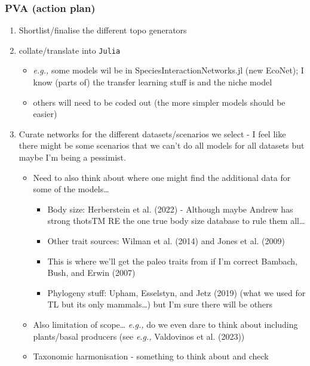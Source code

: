 \documentclass[
  letterpaper,
  DIV=11,
  numbers=noendperiod]{scrartcl}
\providecommand{\tightlist}{%
  \setlength{\itemsep}{0pt}\setlength{\parskip}{0pt}}\usepackage{longtable,booktabs,array}
\begin{document}
\subsubsection{PVA (action plan)}\label{pva-action-plan}

\begin{enumerate}
\def\labelenumi{\arabic{enumi}.}
\tightlist
\item
  Shortlist/finalise the different topo generators
\item
  collate/translate into \texttt{Julia}

  \begin{itemize}
  \tightlist
  \item
    \emph{e.g.,} some models wil be in SpeciesInteractionNetworks.jl
    (new EcoNet); I know (parts of) the transfer learning stuff is and
    the niche model
  \item
    others will need to be coded out (the more simpler models should be
    easier)
  \end{itemize}
\item
  Curate networks for the different datasets/scenarios we select - I
  feel like there might be some scenarios that we can't do all models
  for all datasets but maybe I'm being a pessimist.

  \begin{itemize}
  \tightlist
  \item
    Need to also think about where one might find the additional data
    for some of the models\ldots{}

    \begin{itemize}
    \tightlist
    \item
      Body size: Herberstein et al. (2022) - Although maybe Andrew has
      strong thotsTM RE the one true body size database to rule them
      all\ldots{}
    \item
      Other trait sources: Wilman et al. (2014) and Jones et al. (2009)
    \item
      This is where we'll get the paleo traits from if I'm correct
      Bambach, Bush, and Erwin (2007)
    \item
      Phylogeny stuff: Upham, Esselstyn, and Jetz (2019) (what we used
      for TL but its only mammals\ldots) but I'm sure there will be
      others
    \end{itemize}
  \item
    Also limitation of scope\ldots{} \emph{e.g.,} do we even dare to
    think about including plants/basal producers (see \emph{e.g.,}
    Valdovinos et al. (2023))
  \item
    Taxonomic harmonisation - something to think about and check
  \end{itemize}
\end{enumerate}
\end{document}
